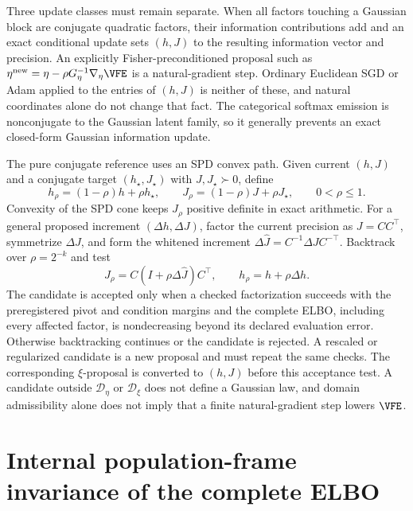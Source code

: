 Three update classes must remain separate. When all factors touching a Gaussian block are conjugate quadratic factors, their information contributions add and an exact conditional update sets $(h,J)$ to the resulting information vector and precision. An explicitly Fisher-preconditioned proposal such as $\eta^{\mathrm{new}}=\eta-\rho G_\eta^{-1}\nabla_\eta\VFE$ is a natural-gradient step. Ordinary Euclidean SGD or Adam applied to the entries of $(h,J)$ is neither of these, and natural coordinates alone do not change that fact. The categorical softmax emission is nonconjugate to the Gaussian latent family, so it generally prevents an exact closed-form Gaussian information update.

The pure conjugate reference uses an SPD convex path. Given current $(h,J)$ and a conjugate target $(h_\star,J_\star)$ with $J,J_\star\succ0$, define
\begin{equation}
h_\rho=(1-\rho)h+\rho h_\star,
\qquad
J_\rho=(1-\rho)J+\rho J_\star,
\qquad 0<\rho\leq1.
\label{eq:spd-convex-damped-coordinate-path}
\end{equation}
Convexity of the SPD cone keeps $J_\rho$ positive definite in exact arithmetic. For a general proposed increment $(\Delta h,\Delta J)$, factor the current precision as $J=CC^\top$, symmetrize $\Delta J$, and form the whitened increment $\Delta\widehat J=C^{-1}\Delta JC^{-\top}$. Backtrack over $\rho=2^{-k}$ and test
\begin{equation}
J_\rho=C(I+\rho\Delta\widehat J)C^\top,
\qquad
h_\rho=h+\rho\Delta h.
\label{eq:whitened-spd-backtracking-path}
\end{equation}
The candidate is accepted only when a checked factorization succeeds with the preregistered pivot and condition margins and the complete ELBO, including every affected factor, is nondecreasing beyond its declared evaluation error. Otherwise backtracking continues or the candidate is rejected. A rescaled or regularized candidate is a new proposal and must repeat the same checks. The corresponding $\xi$-proposal is converted to $(h,J)$ before this acceptance test. A candidate outside $\mathcal D_\eta$ or $\mathcal D_\xi$ does not define a Gaussian law, and domain admissibility alone does not imply that a finite natural-gradient step lowers $\VFE$.

\section{Internal population-frame invariance of the complete ELBO}

